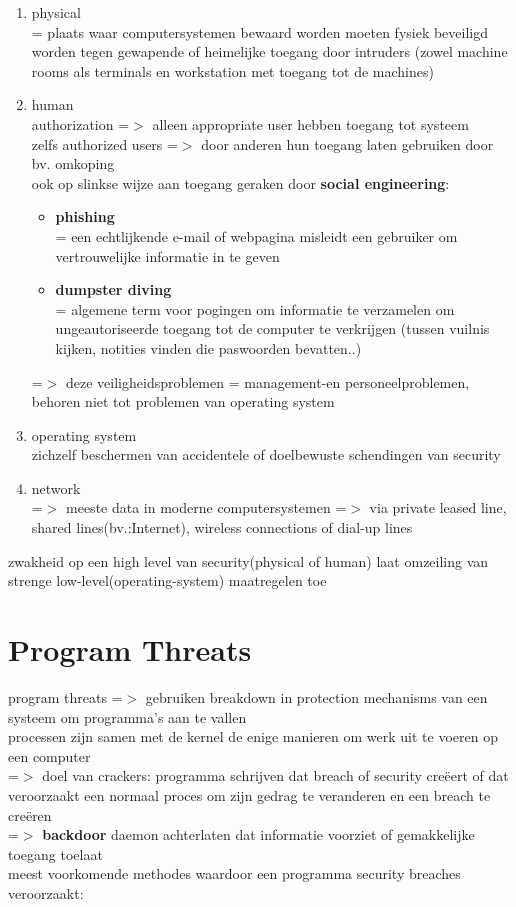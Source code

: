 \documentclass{report}
\begin{document}
\begin{enumerate}
\item physical
\\= plaats waar computersystemen bewaard worden moeten fysiek beveiligd worden tegen gewapende of heimelijke toegang door intruders (zowel machine rooms als terminals en workstation met toegang tot de machines)
\item{human}
\\authorization =$>$ alleen appropriate user hebben toegang tot systeem
\\zelfs authorized users =$>$ door anderen hun toegang laten gebruiken door bv. omkoping
\\ ook op slinkse wijze aan toegang geraken door \textbf{social engineering}:
\begin{itemize}
\item \textbf{phishing}
\\= een echtlijkende e-mail of webpagina misleidt een gebruiker om vertrouwelijke informatie in te geven
\item \textbf{dumpster diving}
\\= algemene term voor pogingen om informatie te verzamelen om ungeautoriseerde toegang tot de computer te verkrijgen (tussen vuilnis kijken, notities vinden die paswoorden bevatten..)
\end{itemize}
=$>$ deze veiligheidsproblemen = management-en personeelproblemen, behoren niet tot problemen van operating system
\item operating system
\\zichzelf beschermen van accidentele of doelbewuste schendingen van security
\item network
\\=$>$ meeste data in moderne computersystemen =$>$ via private leased line, shared lines(bv.:Internet), wireless connections of dial-up lines
\end{enumerate}
zwakheid op een high level van security(physical of human) laat omzeiling van strenge low-level(operating-system) maatregelen toe

\section{Program Threats}
program threats =$>$ gebruiken breakdown in protection mechanisms van een systeem om programma's aan te vallen
\\processen zijn samen met de kernel de enige manieren om werk uit te voeren op een computer
\\=$>$ doel van crackers: programma schrijven dat breach of security cre\"eert of dat veroorzaakt een normaal proces om zijn gedrag te veranderen en een breach te cre\"eren
\\=$>$ \textbf{backdoor} daemon achterlaten dat informatie voorziet of gemakkelijke toegang toelaat 
\\meest voorkomende methodes waardoor een programma security breaches veroorzaakt:
\end{document}
